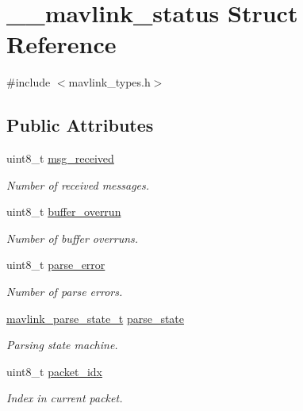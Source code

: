 \hypertarget{struct____mavlink__status}{}\section{\+\_\+\+\_\+mavlink\+\_\+status Struct Reference}
\label{struct____mavlink__status}


{\ttfamily \#include $<$mavlink\+\_\+types.\+h$>$}

\subsection*{Public Attributes}
\begin{DoxyCompactItemize}
\item 
uint8\+\_\+t \mbox{\hyperlink{struct____mavlink__status_a183576e45facc9da8123b7866d458680}{msg\+\_\+received}}
\begin{DoxyCompactList}\small\item\em Number of received messages. \end{DoxyCompactList}\item 
uint8\+\_\+t \mbox{\hyperlink{struct____mavlink__status_ae0ceb5a136021ee78c953f2e86d772cb}{buffer\+\_\+overrun}}
\begin{DoxyCompactList}\small\item\em Number of buffer overruns. \end{DoxyCompactList}\item 
uint8\+\_\+t \mbox{\hyperlink{struct____mavlink__status_ae7a52aa0c84929dbf181220c689f9ec8}{parse\+\_\+error}}
\begin{DoxyCompactList}\small\item\em Number of parse errors. \end{DoxyCompactList}\item 
\mbox{\hyperlink{include__v0_89_2mavlink__types_8h_a4eeb14ddb07e997fe1d671d6823e35a1}{mavlink\+\_\+parse\+\_\+state\+\_\+t}} \mbox{\hyperlink{struct____mavlink__status_aaf6742a61bbc641a4600184b3260fa0f}{parse\+\_\+state}}
\begin{DoxyCompactList}\small\item\em Parsing state machine. \end{DoxyCompactList}\item 
uint8\+\_\+t \mbox{\hyperlink{struct____mavlink__status_a3e582235849323267974003eb1793e25}{packet\+\_\+idx}}
\begin{DoxyCompactList}\small\item\em Index in current packet. \end{DoxyCompactList}\item 

\end{DoxyCompactItemize}
